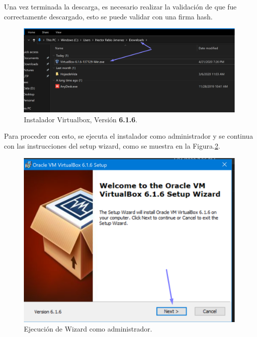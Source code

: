 \documentclass[letterpaper, 12pt, oneside]{article}
\begin{document}
    Una vez terminada la descarga, es necesario realizar la validación de que fue correctamente descargado, esto se puede validar con una firma hash. 
    \begin{center}
     \begin{figure}[H]
        \includegraphics[scale=0.7]{img/install/virtualbox2.png}
        \caption{Instalador Virtualbox, Versión \textbf{6.1.6}.}
        \label{fig:vbox2}
    \end{figure}       
    \end{center}

    Para proceder con esto, se ejecuta el instalador como administrador y se continua con las instrucciones del setup wizard, como se muestra en la Figura.\ref{fig:vbox3}.
    \begin{center}
    \begin{figure}[H]
        \includegraphics[scale=0.8]{img/install/virtualbox3.png}
        \caption{Ejecución de Wizard como administrador.}
        \label{fig:vbox3}
    \end{figure}    
    \end{center}
    
\end{document}
